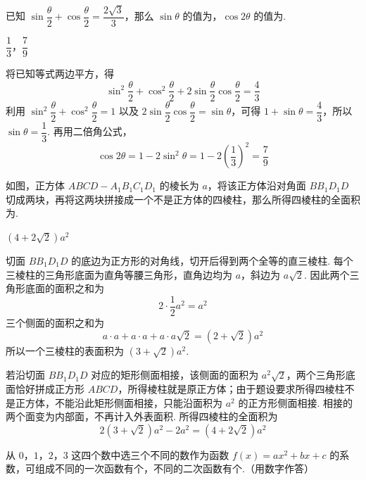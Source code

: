 \begin{problem}
已知 \(\sin\dfrac{\theta}{2}+\cos\dfrac{\theta}{2}=\dfrac{2\sqrt{3}}{3}\)，那么 \(\sin\theta\) 的值为\fillinblank{}，\(\cos2\theta\) 的值为\fillinblank{}.
\end{problem}

\begin{answer}
\(\dfrac13\)，\(\dfrac79\)
\end{answer}

\begin{solution}
将已知等式两边平方，得
\[
\sin^2\frac\theta2+\cos^2\frac\theta2+2\sin\frac\theta2\cos\frac\theta2=\frac43
\]
利用 \(\sin^2\dfrac\theta2+\cos^2\dfrac\theta2=1\) 以及 \(2\sin\dfrac\theta2\cos\dfrac\theta2=\sin\theta\)，可得 \(1+\sin\theta=\dfrac43\)，所以 \(\sin\theta=\dfrac13\). 再用二倍角公式，
\[
\cos2\theta=1-2\sin^2\theta=1-2\left(\frac13\right)^2=\frac79
\]
\end{solution}

\begin{problem}
如图，正方体 \(ABCD-A_1B_1C_1D_1\) 的棱长为 \(a\)，将该正方体沿对角面 \(BB_1D_1D\) 切成两块，再将这两块拼接成一个不是正方体的四棱柱，那么所得四棱柱的全面积为\fillinblank{}.

\begin{center}
\end{center}
\end{problem}

\begin{answer}
\((4+2\sqrt{2})a^2\)
\end{answer}

\begin{solution}
切面 \(BB_1D_1D\) 的底边为正方形的对角线，切开后得到两个全等的直三棱柱. 每个三棱柱的三角形底面为直角等腰三角形，直角边均为 \(a\)，斜边为 \(a\sqrt2\). 因此两个三角形底面的面积之和为
\[
2\cdot\frac12a^2=a^2
\]
三个侧面的面积之和为
\[
a\cdot a+a\cdot a+a\cdot a\sqrt2=(2+\sqrt2)a^2
\]
所以一个三棱柱的表面积为 \((3+\sqrt2)a^2\).

若沿切面 \(BB_1D_1D\) 对应的矩形侧面相接，该侧面的面积为 \(a^2\sqrt2\)，两个三角形底面恰好拼成正方形 \(ABCD\)，所得棱柱就是原正方体；由于题设要求所得四棱柱不是正方体，不能沿此矩形侧面相接，只能沿面积为 \(a^2\) 的正方形侧面相接. 相接的两个面变为内部面，不再计入外表面积. 所得四棱柱的全面积为
\[
2(3+\sqrt2)a^2-2a^2=(4+2\sqrt2)a^2
\]
\end{solution}

\begin{problem}
从 \(0\)，\(1\)，\(2\)，\(3\) 这四个数中选三个不同的数作为函数 \(f(x)=ax^2+bx+c\) 的系数，可组成不同的一次函数有\fillinblank{}个，不同的二次函数有\fillinblank{}个.（用数字作答）
\end{problem}

